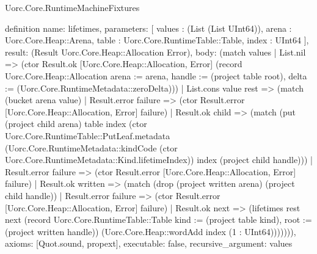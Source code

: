 \begin{lexlean}{Uorc.Core.RuntimeMachineFixtures}
\begin{semanticmodule}
definition{
  name: lifetimes,
  parameters: [
    values : (List (List UInt64)),
    arena : Uorc.Core.Heap::Arena,
    table : Uorc.Core.RuntimeTable::Table,
    index : UInt64
  ],
  result: (Result Uorc.Core.Heap::Allocation Error),
  body: (match values
    | List.nil => (ctor Result.ok [Uorc.Core.Heap::Allocation, Error] (record Uorc.Core.Heap::Allocation {arena := arena, handle := (project table root), delta := (Uorc.Core.RuntimeMetadata::zeroDelta)}))
    | List.cons value rest => (match (bucket arena value)
      | Result.error failure => (ctor Result.error [Uorc.Core.Heap::Allocation, Error] failure)
      | Result.ok child => (match (put (project child arena) table index (ctor Uorc.Core.RuntimeTable::PutLeaf.metadata (Uorc.Core.RuntimeMetadata::kindCode (ctor Uorc.Core.RuntimeMetadata::Kind.lifetimeIndex)) index (project child handle)))
        | Result.error failure => (ctor Result.error [Uorc.Core.Heap::Allocation, Error] failure)
        | Result.ok written => (match (drop (project written arena) (project child handle))
          | Result.error failure => (ctor Result.error [Uorc.Core.Heap::Allocation, Error] failure)
          | Result.ok next => (lifetimes rest next (record Uorc.Core.RuntimeTable::Table {kind := (project table kind), root := (project written handle)}) (Uorc.Core.Heap::wordAdd index (1 : UInt64))))))),
  axioms: [Quot.sound, propext],
  executable: false,
  recursive_argument: values
}


\end{semanticmodule}
\end{lexlean}
